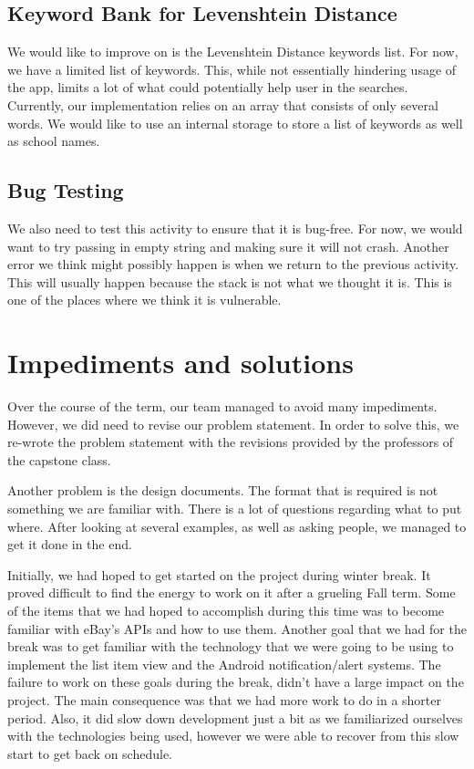 \documentclass[journal,compsoc, 10pt, draftclsnofoot, onecolumn]{IEEEtran}
\begin{document}
\subsection{Keyword Bank for Levenshtein Distance}
We would like to improve on is the Levenshtein Distance keywords list. For now, 
we have a limited list of keywords. This, while not essentially hindering usage of 
the app, limits a lot of what could potentially help user in the searches. Currently,
 our implementation relies on an array that consists of only several words. We would 
like to use an internal storage to store a list of keywords as well as school names.

\subsection{Bug Testing}
We also need to test this activity to ensure that it is bug-free. For now, we would 
want to try passing in empty string and making sure it will not crash. Another error 
we think might possibly happen is when we return to the previous activity. This will 
usually happen because the stack is not what we thought it is. This is one of the 
places where we think it is vulnerable.

\section{Impediments and solutions}
Over the course of the term, our team managed to avoid many impediments. However, 
we did need to revise our problem statement. In order to solve this, we re-wrote the 
problem statement with the revisions provided by the professors of the capstone 
class. \newline

Another problem is the design documents. The format that is required is not 
something we are familiar with. There is a lot of questions regarding what to 
put where. After looking at several examples, as well as asking people, 
we managed to get it done in the end.\newline

Initially, we had hoped to get started on the project during winter break. 
It proved difficult to find the energy to work on it after a grueling Fall 
term. Some of the items that we had hoped to accomplish during this time was 
to become familiar with eBay's APIs and how to use them. Another goal that we 
had for the break was to get familiar with the technology that we were going 
to be using to implement the list item view and the Android notification/alert 
systems. The failure to work on these goals during the break, didn't have a 
large impact on the project. The main consequence was that we had more work to 
do in a shorter period. Also, it did slow down development just a bit as we 
familiarized ourselves with the technologies being used, however we were able 
to recover from this slow start to get back on schedule.\newline
\end{document}
